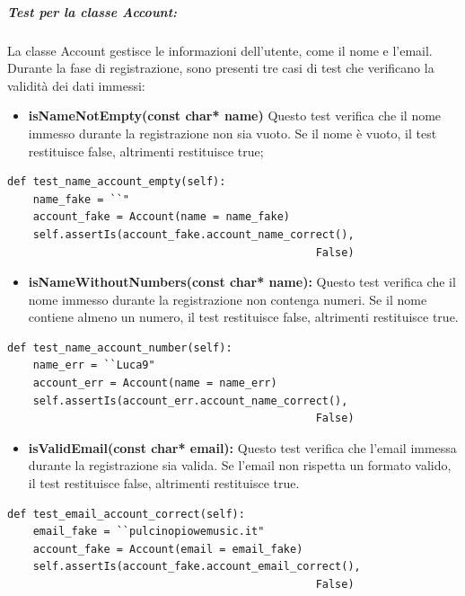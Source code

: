 \vspace{10pt}
\subparagraph{Test per la classe \textbf{Account:}} La classe Account gestisce le informazioni dell'utente, come il nome e l'email. 
Durante la fase di registrazione, sono presenti tre casi di test che verificano la validità dei dati immessi:
\vspace{2pt}
\begin{itemize}
    \item \textbf{isNameNotEmpty(const char* name)}
    Questo test verifica che il nome immesso durante la registrazione non sia vuoto. Se il nome è vuoto, il test restituisce false, altrimenti restituisce true;
\end{itemize}
\vspace{2pt}
\begin{lstlisting}[caption={class AccountModelTests(TestCase)}, captionpos=b]   
def test_name_account_empty(self):
    name_fake = ``"
    account_fake = Account(name = name_fake)
    self.assertIs(account_fake.account_name_correct(), 
                                                False)
\end{lstlisting} 


\newpage
\begin{itemize}    
    \item \textbf{isNameWithoutNumbers(const char* name):}
    Questo test verifica che il nome immesso durante la registrazione non contenga numeri. Se il nome contiene almeno un numero, il test restituisce false, altrimenti restituisce true.
\end{itemize}
\vspace{2pt}
\begin{lstlisting}[caption={class AccountModelTests(TestCase)}, captionpos=b]
def test_name_account_number(self):
    name_err = ``Luca9"
    account_err = Account(name = name_err)
    self.assertIs(account_err.account_name_correct(), 
                                                False)
\end{lstlisting} 
\vspace{10pt}

\begin{itemize}
    \item \textbf{isValidEmail(const char* email):}
    Questo test verifica che l'email immessa durante la registrazione sia valida. Se l'email non rispetta un formato valido, il test restituisce false, altrimenti restituisce true.
\end{itemize}
\vspace{2pt}
\begin{lstlisting}[caption={class AccountModelTests(TestCase)}, captionpos=b]
def test_email_account_correct(self):
    email_fake = ``pulcinopiowemusic.it"
    account_fake = Account(email = email_fake)
    self.assertIs(account_fake.account_email_correct(), 
                                                False)
\end{lstlisting}

